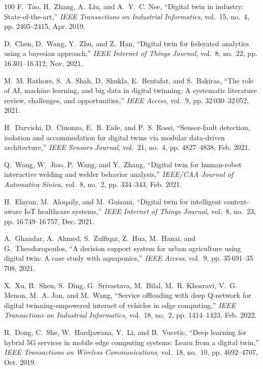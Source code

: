 \documentclass[journal]{IEEEtran}
\begin{document}
\begin{thebibliography}{100}
	F.~Tao, H.~Zhang, A.~Liu, and A.~Y.~C. Nee, ``Digital twin in industry:
	State-of-the-art,'' \emph{IEEE Transactions on Industrial Informatics},
	vol.~15, no.~4, pp. 2405--2415, Apr. 2019.
	
	D.~Chen, D.~Wang, Y.~Zhu, and Z.~Han, ``Digital twin for federated analytics
	using a bayesian approach,'' \emph{IEEE Internet of Things Journal}, vol.~8,
	no.~22, pp. 16\,301--16\,312, Nov. 2021.
	
	M.~M. Rathore, S.~A. Shah, D.~Shukla, E.~Bentafat, and S.~Bakiras, ``The role
	of {AI}, machine learning, and big data in digital twinning: A systematic
	literature review, challenges, and opportunities,'' \emph{IEEE Access},
	vol.~9, pp. 32\,030--32\,052, 2021.
	
	H.~Darvishi, D.~Ciuonzo, E.~R. Eide, and P.~S. Rossi, ``Sensor-fault detection,
	isolation and accommodation for digital twins via modular data-driven
	architecture,'' \emph{IEEE Sensors Journal}, vol.~21, no.~4, pp. 4827--4838,
	Feb. 2021.
	
	Q.~Wang, W.~Jiao, P.~Wang, and Y.~Zhang, ``Digital twin for human-robot
	interactive welding and welder behavior analysis,'' \emph{IEEE/CAA Journal of
		Automatica Sinica}, vol.~8, no.~2, pp. 334--343, Feb. 2021.
	
	H.~Elayan, M.~Aloqaily, and M.~Guizani, ``Digital twin for intelligent
	context-aware {IoT} healthcare systems,'' \emph{IEEE Internet of Things
		Journal}, vol.~8, no.~23, pp. 16\,749--16\,757, Dec. 2021.
	
	A.~Ghandar, A.~Ahmed, S.~Zulfiqar, Z.~Hua, M.~Hanai, and G.~Theodoropoulos, ``A
	decision support system for urban agriculture using digital twin: A case
	study with aquaponics,'' \emph{IEEE Access}, vol.~9, pp. 35\,691--35\,708,
	2021.
	
	X.~Xu, B.~Shen, S.~Ding, G.~Srivastava, M.~Bilal, M.~R. Khosravi, V.~G. Menon,
	M.~A. Jan, and M.~Wang, ``Service offloading with deep {Q}-network for
	digital twinning-empowered internet of vehicles in edge computing,''
	\emph{IEEE Transactions on Industrial Informatics}, vol.~18, no.~2, pp.
	1414--1423, Feb. 2022.
	
	R.~Dong, C.~She, W.~Hardjawana, Y.~Li, and B.~Vucetic, ``Deep learning for
	hybrid {5G} services in mobile edge computing systems: Learn from a digital
	twin,'' \emph{IEEE Transactions on Wireless Communications}, vol.~18, no.~10,
	pp. 4692--4707, Oct. 2019.
	

\end{thebibliography}
\end{document}
